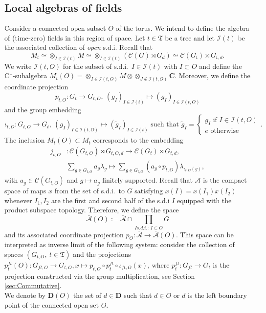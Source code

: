 \documentclass[a4paper,12pt]{amsart}
\numberwithin{equation}{section}
\theoremstyle{definition}
\newcommand{\oscrA}{{\overline{\mathscr{A}}}}
\newcommand{\scrC}{\mathscr C}
\newcommand{\C}{\mathbf C}
\newcommand{\D}{\mathbf D}
\newcommand{\cI}{\mathcal I}
\newcommand{\la}{\lambda}
\newcommand{\ot}{\otimes}\newcommand{\otmin}{\otimes_{\text{min}}}
\newcommand{\fT}{\mathfrak T}
\begin{document}
\subsection{Local algebras of fields}\label{sec:fieldalg}
Consider a connected open subset $O$ of the torus.
We intend to define the algebra of (time-zero) fields in this region of space.
Let $t\in\fT$ be a tree and let $\cI(t)$ be the associated collection of {\it open} s.d.i.
Recall that 
$$M_t \simeq \ot_{I\in \cI(t)} M \simeq \ot_{I\in \cI(t)} (\scrC(G)\rtimes G_d ) \simeq \scrC(G_t)\rtimes G_{t,d}.$$
We write $\cI(t,O)$ for the subset of s.d.i.~$I\in \cI(t)$ with $I\subset O$ and define the C*-subalgebra $M_t(O) = \ot_{I\in \cI(t,O)} M \ot \ot_{J\notin \cI(t,O)} \C$.
Moreover, we define the coordinate projection 
$$p_{t,O}: G_t \to G_{t,O},\ (g_I)_{I\in \cI(t)} \mapsto (g_I)_{I\in \cI(t,O)}$$
and the group embedding 
$$\iota_{t,O}: G_{t,O} \to G_{t},\ (g_I)_{I\in \cI(t,O)} \mapsto (\tilde g_I)_{I\in \cI(t)} \text{ such that } \tilde g_I = \begin{cases} g_I \text{ if } I \in \cI(t,O)\\ e \text{ otherwise } \end{cases}.$$
The inclusion $M_t(O)\subset M_t$ corresponds to the embedding 
\begin{align*}
j_{t,O} & :\scrC(G_{t,O})\rtimes G_{t,O,d} \to \scrC(G_{t})\rtimes G_{t,d},\\
& \sum_{g\in G_{t,O}} a_g \la_g\mapsto \sum_{g\in G_{t,O}} (a_g\circ p_{t,O} )\la_{\iota_{t,O}(g)},
\end{align*}
with $a_g\in\scrC(G_{t,O})$ and $g\mapsto a_g$ finitely supported.
Recall that $\oscrA$ is the compact space of maps $x$ from the set of s.d.i.~to $G$ satisfying $x(I) = x(I_1)x(I_2)$ whenever $I_1,I_2$ are the first and second half of the s.d.i $I$ equipped with the product subspace topology.
Therefore, we define the space 
$$\oscrA(O):= \oscrA \cap \prod_{I s.d.i.~: I\subset O} G$$
and its associated coordinate projection $p_O:\oscrA\to \oscrA(O)$. This space can be interpreted as inverse limit of the following system:
consider the collection of spaces $(G_{t,O},\ t\in\fT)$ and the projections $p_t^{ft}(O): G_{ft,O}\to G_{t,O}, x\mapsto p_{t,O}\circ p_t^{ft}\circ\iota_{ft,O}(x)$, where $p_t^{ft}:G_{ft}\to G_t$ is the projection constructed via the group multiplication, see Section \ref{sec:Commutative}.\\[0.1cm]
We denote by $\D(O)$ the set of $d\in \D$ such that $d\in O$ or $d$ is the left boundary point of the connected open set $O.$
\end{document}
